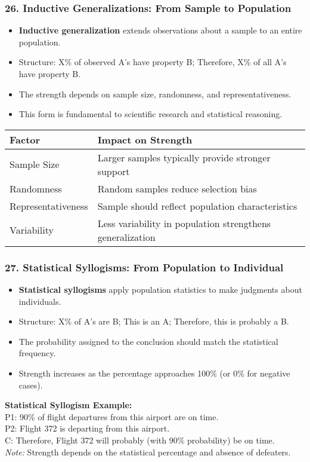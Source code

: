 \documentclass{beamer}
\begin{document}
\begin{frame}
\frametitle{26. Inductive Generalizations: From Sample to Population}
\begin{itemize}
\item \textbf{Inductive generalization} extends observations about a sample to an entire population.
\item Structure: X\% of observed A's have property B; Therefore, X\% of all A's have property B.
\item The strength depends on sample size, randomness, and representativeness.
\item This form is fundamental to scientific research and statistical reasoning.
\end{itemize}

\begin{table}
\scriptsize
\begin{tabular}{|l|l|}
\hline
\textbf{Factor} & \textbf{Impact on Strength} \\
\hline
Sample Size & Larger samples typically provide stronger support \\
\hline
Randomness & Random samples reduce selection bias \\
\hline
Representativeness & Sample should reflect population characteristics \\
\hline
Variability & Less variability in population strengthens generalization \\
\hline
\end{tabular}
\end{table}
\end{frame}

\begin{frame}
\frametitle{27. Statistical Syllogisms: From Population to Individual}
\begin{itemize}
\item \textbf{Statistical syllogisms} apply population statistics to make judgments about individuals.
\item Structure: X\% of A's are B; This is an A; Therefore, this is probably a B.
\item The probability assigned to the conclusion should match the statistical frequency.
\item Strength increases as the percentage approaches 100\% (or 0\% for negative cases).
\end{itemize}

\begin{example}
\scriptsize
\textbf{Statistical Syllogism Example:}\\

P1: 90\% of flight departures from this airport are on time.\\
P2: Flight 372 is departing from this airport.\\
C: Therefore, Flight 372 will probably (with 90\% probability) be on time.\\

\textit{Note:} Strength depends on the statistical percentage and absence of defeaters.
\end{example}
\end{frame}
\end{document}
